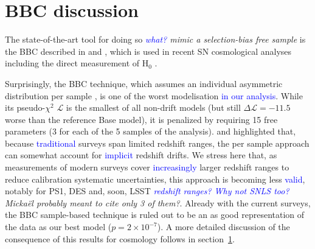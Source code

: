 \documentclass[]{aa} %
\newcommand{\mr}[1]{{\textcolor[rgb]{0.60,0.10,0.6}{#1}}}
\newcommand{\nn}[1]{{\textcolor[rgb]{1, 0.27, 0}{#1}}}
\newcommand{\yc}[1]{{\textcolor{blue}{#1}}}
\begin{document}
\section{\nn{BBC discussion}}
\label{sec:bbc}

\mr{The state-of-the-art tool for doing so \textit{\yc{what?} \nn{mimic a selection-bias free sample}} is the BBC described in
    \cite{scolnic2016} and \cite{kessler2017}, which is used in recent SN
    cosmological analyses \citep{jones2018b, scolnic2018a, brout2019,
    descosmopaper2019} including the direct measurement of H$_0$
\citep{riess2016,riess2019}.}

\mr{Surprisingly, the BBC technique, which assumes an individual asymmetric
    distribution per sample \citep{scolnic2016,kessler2017}, is one of the worst
    modelisation \yc{in our analysis}. While its pseudo-$\chi^{2}$ $\mathcal{L}$ is the smallest of all
    non-drift models (but still $\Delta \mathcal{L}=-11.5$ worse than the
    reference Base model), it is penalized by requiring 15 free parameters (3 for each of the 5 samples of the analysis).
    \citet[][section~2]{scolnic2016} and \citet[][section~5.4]{scolnic2018a}
    highlighted that, because \yc{traditional} surveys span limited redshift ranges, the
    per sample approach can somewhat account for \yc{implicit} redshift drifts. We
    stress here that, as measurements of modern surveys cover \yc{increasingly} larger redshift
    ranges to reduce calibration systematic uncertainties, this approach is becoming
    less \yc{valid}, notably for PS1, DES and, soon, LSST \textit{\yc{redshift ranges? Why not SNLS too?} \nn{Mickaël probably meant to cite only 3 of them?}}. Already with the current
    surveys, the BBC sample-based technique is \nn{ruled out} to be an as good
    representation of the data as our best model ($p=2\times 10^{-7}$). A more
    detailed discussion of the consequence of this results for cosmology follows
in section~\ref{sec:bbc}.}
\end{document}
